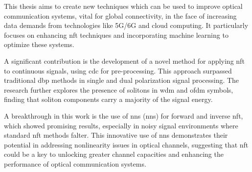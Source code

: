 This thesis aims to create new techniques which can be used to improve optical communication systems, vital for global connectivity, in the face of increasing data demands from technologies like 5G/6G and cloud computing. It particularly focuses on enhancing \acrfull{nft} techniques and incorporating machine learning to optimize these systems.

A significant contribution is the development of a novel method for applying \acrshort{nft} to continuous signals, using \acrfull{cdc} for pre-processing. This approach surpassed traditional \acrfull{dbp} methods in single and dual polarization signal processing. The research further explores the presence of solitons in \gls{wdm} and \gls{ofdm} symbols, finding that soliton components carry a majority of the signal energy.

A breakthrough in this work is the use of \acrlong{nn}s (\acrshort{nn}s) for forward and inverse \acrshort{nft}, which showed promising results, especially in noisy signal environments where standard \acrshort{nft} methods falter. This innovative use of \acrshort{nn}s demonstrates their potential in addressing nonlinearity issues in optical channels, suggesting that \acrshort{nft} could be a key to unlocking greater channel capacities and enhancing the performance of optical communication systems.



    
    
    
    

